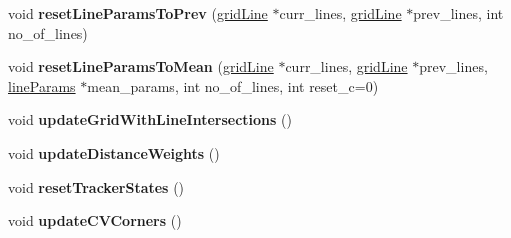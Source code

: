 \begin{DoxyCompactItemize}
\item 
\hypertarget{classLineTracker_a91862b496dd0c80294932847ec8f1674}{void {\bfseries reset\-Line\-Params\-To\-Prev} (\hyperlink{structgridLine}{grid\-Line} $\ast$curr\-\_\-lines, \hyperlink{structgridLine}{grid\-Line} $\ast$prev\-\_\-lines, int no\-\_\-of\-\_\-lines)}\label{classLineTracker_a91862b496dd0c80294932847ec8f1674}

\item 
\hypertarget{classLineTracker_aed08c436973db9d003e771b269828422}{void {\bfseries reset\-Line\-Params\-To\-Mean} (\hyperlink{structgridLine}{grid\-Line} $\ast$curr\-\_\-lines, \hyperlink{structgridLine}{grid\-Line} $\ast$prev\-\_\-lines, \hyperlink{structlineParams}{line\-Params} $\ast$mean\-\_\-params, int no\-\_\-of\-\_\-lines, int reset\-\_\-c=0)}\label{classLineTracker_aed08c436973db9d003e771b269828422}

\item 
\hypertarget{classLineTracker_a18509ae1884c2ca7c6383ecd5357315c}{void {\bfseries update\-Grid\-With\-Line\-Intersections} ()}\label{classLineTracker_a18509ae1884c2ca7c6383ecd5357315c}

\item 
\hypertarget{classLineTracker_afe4467ad69bf51230c01a2fb739b04bc}{void {\bfseries update\-Distance\-Weights} ()}\label{classLineTracker_afe4467ad69bf51230c01a2fb739b04bc}

\item 
\hypertarget{classLineTracker_a19f8e93a431d3fa52c462c77a5d7c5d0}{void {\bfseries reset\-Tracker\-States} ()}\label{classLineTracker_a19f8e93a431d3fa52c462c77a5d7c5d0}

\item 
\hypertarget{classLineTracker_a3f26f799e3970e2eb21c505d47b91941}{void {\bfseries update\-C\-V\-Corners} ()}\label{classLineTracker_a3f26f799e3970e2eb21c505d47b91941}

\end{DoxyCompactItemize}
